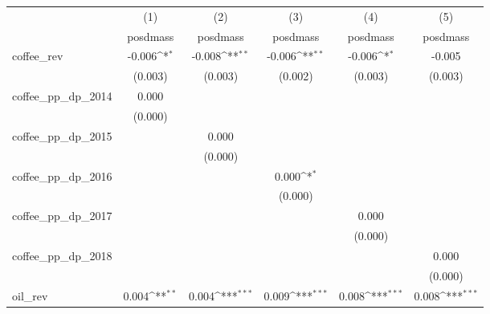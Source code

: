 {
\def\sym#1{\ifmmode^{#1}\else\(^{#1}\)\fi}
\begin{tabular}{l*{5}{c}}
\hline\hline
            &\multicolumn{1}{c}{(1)}&\multicolumn{1}{c}{(2)}&\multicolumn{1}{c}{(3)}&\multicolumn{1}{c}{(4)}&\multicolumn{1}{c}{(5)}\\
            &\multicolumn{1}{c}{posdmass}&\multicolumn{1}{c}{posdmass}&\multicolumn{1}{c}{posdmass}&\multicolumn{1}{c}{posdmass}&\multicolumn{1}{c}{posdmass}\\
\hline
coffee\_rev  &      -0.006\sym{*}  &      -0.008\sym{**} &      -0.006\sym{**} &      -0.006\sym{*}  &      -0.005         \\
            &     (0.003)         &     (0.003)         &     (0.002)         &     (0.003)         &     (0.003)         \\
[1em]
coffee\_pp\_dp\_2014&       0.000         &                     &                     &                     &                     \\
            &     (0.000)         &                     &                     &                     &                     \\
[1em]
coffee\_pp\_dp\_2015&                     &       0.000         &                     &                     &                     \\
            &                     &     (0.000)         &                     &                     &                     \\
[1em]
coffee\_pp\_dp\_2016&                     &                     &       0.000\sym{*}  &                     &                     \\
            &                     &                     &     (0.000)         &                     &                     \\
[1em]
coffee\_pp\_dp\_2017&                     &                     &                     &       0.000         &                     \\
            &                     &                     &                     &     (0.000)         &                     \\
[1em]
coffee\_pp\_dp\_2018&                     &                     &                     &                     &       0.000         \\
            &                     &                     &                     &                     &     (0.000)         \\
[1em]
oil\_rev     &       0.004\sym{**} &       0.004\sym{***}&       0.009\sym{***}&       0.008\sym{***}&       0.008\sym{***}\\

\end{tabular}}
